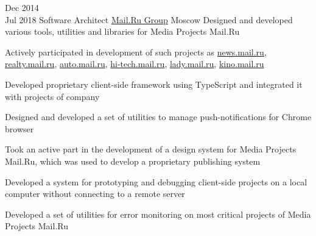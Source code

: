 \documentclass[11pt,a4paper,sans]{moderncv}
\newcommand{\lang}[2]{#2}
\begin{document}
\cventry
    {\lang{Дек}{Dec} 2014\\\lang{Июл}{Jul} 2018}
    {\lang
        {Архитектор программного обеспечения}
        {Software Architect}}
    {\href{https://corp.mail.ru}{Mail.Ru Group}}
    {\lang
        {Москва}
        {Moscow}}
    {}
    {\lang
        {Занимался проектированием и разработкой инструментов, утилит и библиотек в медиапроектах Mail.Ru.}
        {Designed and developed various tools, utilities and libraries for Media Projects Mail.Ru}}

\cvlistitem
    {\lang
        {Принимал участие в разработке проектов \href{https://news.mail.ru}{news.mail.ru}, \href{https://realty.mail.ru}{realty.mail.ru}, \href{https://auto.mail.ru}{auto.mail.ru}, \href{https://hi-tech.mail.ru}{hi-tech.mail.ru}, \href{https://lady.mail.ru}{lady.mail.ru}, \href{https://kino.mail.ru}{kino.mail.ru}}
        {Actively participated in development of such projects as \href{https://news.mail.ru}{news.mail.ru}, \href{https://realty.mail.ru}{realty.mail.ru}, \href{https://auto.mail.ru}{auto.mail.ru}, \href{https://hi-tech.mail.ru}{hi-tech.mail.ru}, \href{https://lady.mail.ru}{lady.mail.ru}, \href{https://kino.mail.ru}{kino.mail.ru}}}

\cvlistitem
    {\lang
        {Разработал фреймворк для создания клиентских приложений с использованием языка TypeScript}
        {Developed proprietary client-side framework using TypeScript and integrated it with projects of company}}

\cvlistitem
    {\lang
        {Разработал и внедрил набор утилит для управления push-уведомлениями для браузера Chrome}
        {Designed and developed a set of utilities to manage push-notifications for Chrome browser}}

\cvlistitem
    {\lang
        {Принимал участие в разработке дизайн-системы для медийных проектов mail.ru, на основе которой была создана система для разработки новых проектов компании}
        {Took an active part in the development of a design system for Media Projects Mail.Ru, which was used to develop a proprietary publishing system}}


\cvlistitem
    {\lang
        {Разработал систему прототипирования и отладки клиентской части проектов на локальном компьютере без подключения к удаленному серверу}
        {Developed a system for prototyping and debugging client-side projects on a local computer without connecting to a remote server}}

\cvlistitem
    {\lang
        {Разработал и внедрил систему мониторинга критических ошибок на высоконагруженных проектах компании}
        {Developed a set of utilities for error monitoring on most critical projects of Media Projects Mail.Ru}\\}
\end{document}
